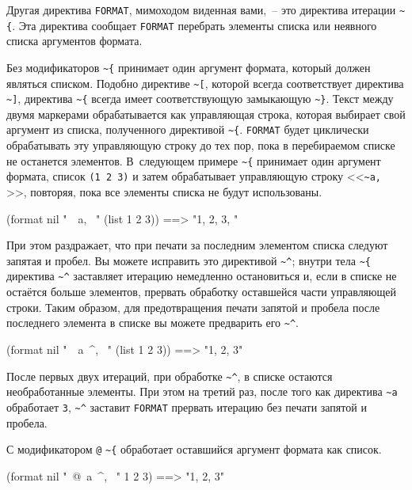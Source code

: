 Другая директива \lstinline{FORMAT}, мимоходом виденная вами,~-- это директива итерации
\lstinline!~{!. Эта директива сообщает \lstinline{FORMAT} перебрать элементы списка или
  неявного списка аргументов формата.

Без модификаторов \lstinline!~{! принимает один аргумент формата, который должен являться списком. Подобно директиве
\lstinline!~[!, которой всегда соответствует директива \lstinline!~]!, директива \lstinline!~{! всегда имеет соответствующую замыкающую
\lstinline!~}!. Текст между двумя маркерами обрабатывается как управляющая строка, которая выбирает свой аргумент из
списка, полученного  директивой \lstinline!~{!. \lstinline{FORMAT} будет циклически обрабатывать эту
управляющую строку до тех пор, пока в перебираемом списке не останется элементов. В~следующем примере \lstinline!~{!
принимает один аргумент формата, список \lstinline{(1 2 3)} и затем обрабатывает управляющую строку <<\lstinline!~a, !>>, повторяя,
пока все элементы списка не будут использованы.

\begin{myverb}
(format nil "~{~a, ~}" (list 1 2 3)) ==> "1, 2, 3, "
\end{myverb}

При этом раздражает, что при печати за последним элементом списка следуют запятая и пробел. Вы можете исправить
это директивой \lstinline!~^!; внутри тела \lstinline!~{! директива \lstinline!~^! заставляет итерацию немедленно остановиться и, если в
списке не остаётся больше элементов, прервать обработку оставшейся части управляющей строки. Таким образом, для
предотвращения печати запятой и пробела после последнего элемента в списке вы можете предварить его \lstinline!~^!.

\begin{myverb}
(format nil "~{~a~^, ~}" (list 1 2 3)) ==> "1, 2, 3"
\end{myverb}

После первых двух итераций, при обработке \lstinline!~^!, в списке остаются необработанные
элементы. При этом на третий раз, после того как директива \lstinline!~a! обработает
\lstinline{3}, \lstinline!~^! заставит \lstinline{FORMAT} прервать итерацию без печати запятой и
пробела.

С модификатором \lstinline!@! \lstinline!~{! обработает оставшийся аргумент формата как список.

\begin{myverb}
(format nil "~@{~a~^, ~}" 1 2 3) ==> "1, 2, 3"
\end{myverb}

